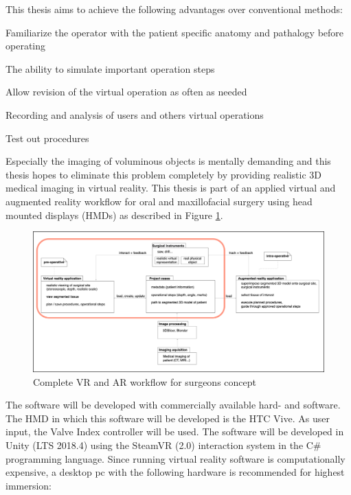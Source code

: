 This thesis aims to achieve the following advantages over conventional methods:
\begin{compactenum}[label=(\alph*)]
    \item Familiarize the operator with the patient specific anatomy and pathalogy before operating
    \item The ability to simulate important operation steps
    \item Allow revision of the virtual operation as often as needed
    \item Recording and analysis of users and others virtual operations
    \item Test out procedures
\end{compactenum}

Especially the imaging of voluminous objects is mentally demanding and this thesis hopes to eliminate this problem completely by providing realistic 3D medical imaging in virtual reality.
This thesis is part of an applied virtual and augmented reality workflow for oral and maxillofacial surgery using head mounted displays (HMDs) as described in Figure \ref{fig::ProjectPlan}.

\begin{figure}[ht!]
    \centering
    \includegraphics[width=\linewidth]{images/project_plan.png}
    \caption{\label{fig::ProjectPlan} Complete VR and AR workflow for surgeons concept}
\end{figure}

The software will be developed with commercially available hard- and software.
The HMD in which this software will be developed is the HTC Vive.
As user input, the Valve Index controller will be used.
The software will be developed in Unity (LTS 2018.4) using the SteamVR (2.0) interaction system in the C\# programming language.
Since running virtual reality software is computationally expensive, a desktop pc with the following hardware is recommended for highest immersion:

